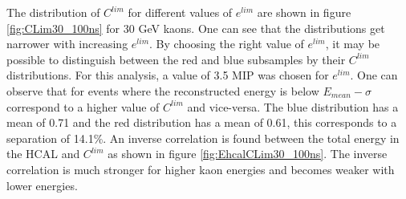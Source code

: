 The distribution of $C^{lim}$ for different values of $e^{lim}$ are shown in figure \ref{fig:CLim30_100ns} for 30 GeV kaons. One can see that the distributions get narrower with increasing $e^{lim}$. By choosing the right value of $e^{lim}$, it may be possible to distinguish between the red and blue subsamples by their $C^{lim}$ distributions. For this analysis, a value of 3.5 MIP was chosen for $e^{lim}$. One can observe that for events where the reconstructed energy is below $E_{mean} - \sigma$ correspond to a higher value of $C^{lim}$ and vice-versa. The blue distribution has a mean of 0.71 and the red distribution has a mean of 0.61, this corresponds to a separation of 14.1\%. An inverse correlation is found between the total energy in the HCAL and $C^{lim}$ as shown in figure \ref{fig:EhcalCLim30_100ns}. The inverse correlation is much stronger for higher kaon energies and becomes weaker with lower energies.

